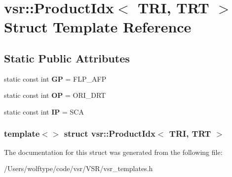 \hypertarget{structvsr_1_1_product_idx_3_01_t_r_i_00_01_t_r_t_01_4}{\section{vsr\-:\-:Product\-Idx$<$ T\-R\-I, T\-R\-T $>$ Struct Template Reference}
\label{structvsr_1_1_product_idx_3_01_t_r_i_00_01_t_r_t_01_4}
}
\subsection*{Static Public Attributes}
\begin{DoxyCompactItemize}
\item 
\hypertarget{structvsr_1_1_product_idx_3_01_t_r_i_00_01_t_r_t_01_4_afa2362a346ab9afa25d04ebed2751bfc}{static const int {\bfseries G\-P} = F\-L\-P\-\_\-\-A\-F\-P}\label{structvsr_1_1_product_idx_3_01_t_r_i_00_01_t_r_t_01_4_afa2362a346ab9afa25d04ebed2751bfc}

\item 
\hypertarget{structvsr_1_1_product_idx_3_01_t_r_i_00_01_t_r_t_01_4_ac1bb7131443071c33940ebb9ed2f649b}{static const int {\bfseries O\-P} = O\-R\-I\-\_\-\-D\-R\-T}\label{structvsr_1_1_product_idx_3_01_t_r_i_00_01_t_r_t_01_4_ac1bb7131443071c33940ebb9ed2f649b}

\item 
\hypertarget{structvsr_1_1_product_idx_3_01_t_r_i_00_01_t_r_t_01_4_a815ed54bcbf43f9d38f0c22301b6458d}{static const int {\bfseries I\-P} = S\-C\-A}\label{structvsr_1_1_product_idx_3_01_t_r_i_00_01_t_r_t_01_4_a815ed54bcbf43f9d38f0c22301b6458d}

\end{DoxyCompactItemize}
\subsubsection*{template$<$$>$ struct vsr\-::\-Product\-Idx$<$ T\-R\-I, T\-R\-T $>$}



The documentation for this struct was generated from the following file\-:\begin{DoxyCompactItemize}
\item 
/\-Users/wolftype/code/vsr/\-V\-S\-R/vsr\-\_\-templates.\-h\end{DoxyCompactItemize}
